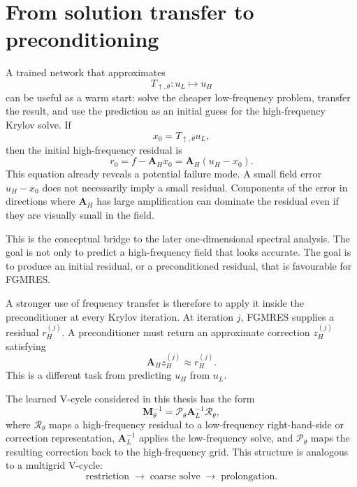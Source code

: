 \section{From solution transfer to preconditioning}
\label{sec:ch5-transfer-to-preconditioning}

A trained network that approximates
\begin{equation}
    T_{\uparrow,\theta}: u_L \mapsto u_H
    \label{eq:ch5-learned-solution-transfer}
\end{equation}
can be useful as a warm start: solve the cheaper low-frequency problem, transfer
the result, and use the prediction as an initial guess for the high-frequency
Krylov solve. If
\begin{equation}
    x_0 = T_{\uparrow,\theta}u_L,
    \label{eq:ch5-warm-start}
\end{equation}
then the initial high-frequency residual is
\begin{equation}
    r_0
    =
    f-\mathbf{A}_H x_0
    =
    \mathbf{A}_H(u_H-x_0).
    \label{eq:ch5-residual-error-relation}
\end{equation}
This equation already reveals a potential failure mode. A small field error
$u_H-x_0$ does not necessarily imply a small residual. Components of the error
in directions where $\mathbf{A}_H$ has large amplification can dominate the
residual even if they are visually small in the field.

This is the conceptual bridge to the later one-dimensional spectral analysis.
The goal is not only to predict a high-frequency field that looks accurate. The
goal is to produce an initial residual, or a preconditioned residual, that is
favourable for FGMRES.

A stronger use of frequency transfer is therefore to apply it inside the
preconditioner at every Krylov iteration. At iteration $j$, FGMRES supplies a
residual $r_H^{(j)}$. A preconditioner must return an approximate correction
$z_H^{(j)}$ satisfying
\begin{equation}
    \mathbf{A}_H z_H^{(j)}
    \approx
    r_H^{(j)}.
    \label{eq:ch5-preconditioner-task}
\end{equation}
This is a different task from predicting $u_H$ from $u_L$.

The learned V-cycle considered in this thesis has the form
\begin{equation}
    \mathbf{M}_{\theta}^{-1}
    =
    \mathcal{P}_{\theta}
    \mathbf{A}_L^{-1}
    \mathcal{R}_{\theta},
    \label{eq:ch5-learned-vcycle}
\end{equation}
where $\mathcal{R}_{\theta}$ maps a high-frequency residual to a low-frequency
right-hand-side or correction representation, $\mathbf{A}_L^{-1}$ applies the
low-frequency solve, and $\mathcal{P}_{\theta}$ maps the resulting correction
back to the high-frequency grid. This structure is analogous to a multigrid
V-cycle:
\begin{equation}
    \text{restriction}
    \;\longrightarrow\;
    \text{coarse solve}
    \;\longrightarrow\;
    \text{prolongation}.
    \label{eq:ch5-vcycle-words}
\end{equation}

